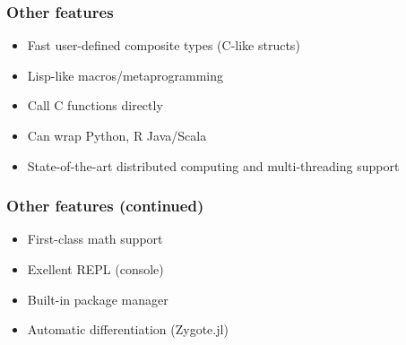 \documentclass[t]{beamer}
\newcommand\df{\bf\color{Maroon}}
\begin{document}
% 





\begin{frame}
  \frametitle{Other features}
  \begin{itemize}
    \item Fast user-defined composite types (C-like structs)
    \item Lisp-like macros/metaprogramming
    \item Call C functions directly
    \item Can wrap Python, R Java/Scala
    \item State-of-the-art distributed computing and multi-threading support
  \end{itemize}
\end{frame}

\begin{frame}
  \frametitle{Other features (continued)}
  \begin{itemize}
  \item First-class math support
    \item Exellent REPL (console)
    \item Built-in package manager
    \item Automatic differentiation (Zygote.jl)
  \end{itemize}
\end{frame}
\end{document}
